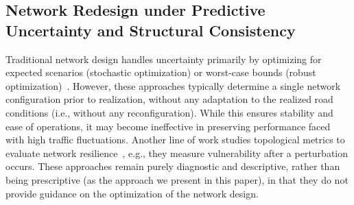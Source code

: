 \documentclass[a4paper,fleqn]{cas-sc}
\begin{document}
\subsection{Network Redesign under Predictive Uncertainty and Structural Consistency}
\label{sec:proactive}

Traditional network design handles uncertainty primarily by optimizing for expected scenarios (stochastic optimization) or worst-case bounds (robust optimization)~\citep{bertsimas2018data, wang2020robust}.
However, these approaches typically determine a single network configuration prior to realization, without any adaptation to the realized road conditions (i.e., without any reconfiguration). While this ensures stability and ease of operations, it may become ineffective in preserving performance faced with high traffic fluctuations.
%
%
Another line of work studies topological metrics to evaluate network resilience~\citep{Massobrio2024, Pu2022}, e.g., they measure vulnerability after a perturbation occurs. These approaches remain purely diagnostic and descriptive, rather than being prescriptive (as the approach we present in this paper), in that they do not provide guidance on the optimization of the network design. 
%

%
\end{document}
